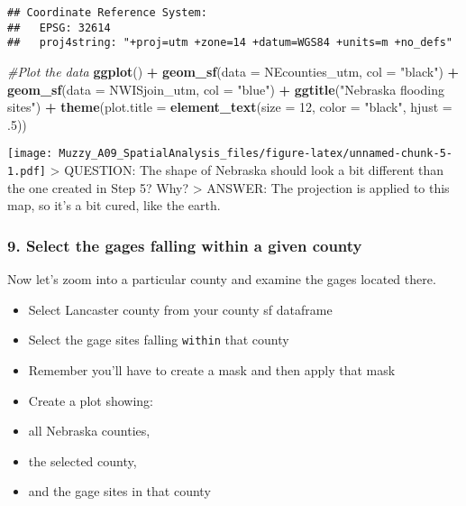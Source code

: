 \documentclass[]{article}
\newenvironment{Shaded}{\begin{snugshade}}{\end{snugshade}}
\newcommand{\KeywordTok}[1]{\textcolor[rgb]{0.13,0.29,0.53}{\textbf{#1}}}
\newcommand{\DataTypeTok}[1]{\textcolor[rgb]{0.13,0.29,0.53}{#1}}
\newcommand{\DecValTok}[1]{\textcolor[rgb]{0.00,0.00,0.81}{#1}}
\newcommand{\StringTok}[1]{\textcolor[rgb]{0.31,0.60,0.02}{#1}}
\newcommand{\CommentTok}[1]{\textcolor[rgb]{0.56,0.35,0.01}{\textit{#1}}}
\newcommand{\OperatorTok}[1]{\textcolor[rgb]{0.81,0.36,0.00}{\textbf{#1}}}
\newcommand{\NormalTok}[1]{#1}
\providecommand{\tightlist}{%
  \setlength{\itemsep}{0pt}\setlength{\parskip}{0pt}}
\begin{document}
\begin{verbatim}
## Coordinate Reference System:
##   EPSG: 32614 
##   proj4string: "+proj=utm +zone=14 +datum=WGS84 +units=m +no_defs"
\end{verbatim}

\begin{Shaded}
\begin{Highlighting}[]
\CommentTok{#Plot the data}
\KeywordTok{ggplot}\NormalTok{() }\OperatorTok{+}
\KeywordTok{geom_sf}\NormalTok{(}\DataTypeTok{data =}\NormalTok{ NEcounties_utm, }\DataTypeTok{col =} \StringTok{"black"}\NormalTok{) }\OperatorTok{+}
\StringTok{  }\KeywordTok{geom_sf}\NormalTok{(}\DataTypeTok{data =}\NormalTok{ NWISjoin_utm, }\DataTypeTok{col =} \StringTok{"blue"}\NormalTok{) }\OperatorTok{+}
\StringTok{  }\KeywordTok{ggtitle}\NormalTok{(}\StringTok{"Nebraska flooding sites"}\NormalTok{) }\OperatorTok{+}
\StringTok{  }\KeywordTok{theme}\NormalTok{(}\DataTypeTok{plot.title =} \KeywordTok{element_text}\NormalTok{(}\DataTypeTok{size =} \DecValTok{12}\NormalTok{, }\DataTypeTok{color =} \StringTok{"black"}\NormalTok{, }\DataTypeTok{hjust =}\NormalTok{ .}\DecValTok{5}\NormalTok{))}
\end{Highlighting}
\end{Shaded}

\texttt{[image: Muzzy\_A09\_SpatialAnalysis\_files/figure-latex/unnamed-chunk-5-1.pdf]}
\textgreater{} QUESTION: The shape of Nebraska should look a bit
different than the one created in Step 5? Why? \textgreater{} ANSWER:
The projection is applied to this map, so it's a bit cured, like the
earth.

\subsubsection{9. Select the gages falling within a given
county}\label{select-the-gages-falling-within-a-given-county}

Now let's zoom into a particular county and examine the gages located
there.

\begin{itemize}
\tightlist
\item
  Select Lancaster county from your county sf dataframe
\item
  Select the gage sites falling \texttt{within} that county
\item
  Remember you'll have to create a mask and then apply that mask
\item
  Create a plot showing:
\item
  all Nebraska counties,
\item
  the selected county,
\item
  and the gage sites in that county
\end{itemize}
\end{document}
